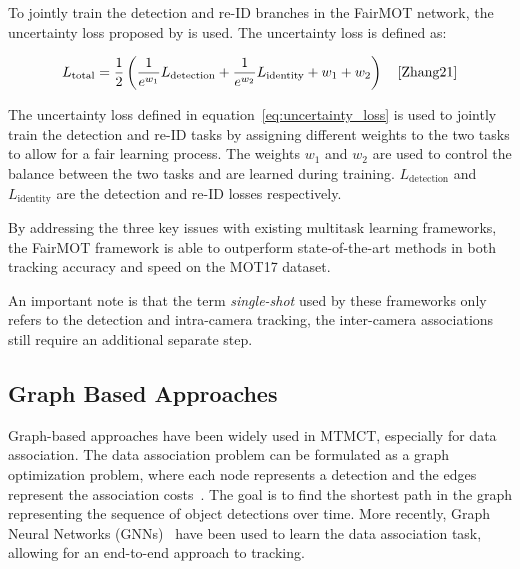 To jointly train the detection and re-ID branches in the FairMOT network, the uncertainty loss proposed by \textcite{Cipolla18} is used. The uncertainty loss is defined as:

\begin{equation}
    \label{eq:uncertainty_loss}
    L_{\text{total}}=\frac{1}{2}\left(\frac{1}{e^{w_1}} L_{\text{detection}}+\frac{1}{e^{w_2}} L_{\text{identity}}+w_1+w_2\right)
    \quad\text{\cite[Eq.~5]{Zhang21}}
\end{equation}

The uncertainty loss defined in equation~\ref{eq:uncertainty_loss} is used to jointly train the detection and re-ID tasks by assigning different weights to the two tasks to allow for a fair learning process. The weights \(w_1\) and \(w_2\) are used to control the balance between the two tasks and are learned during training. \(L_{\text{detection}}\) and \(L_{\text{identity}}\) are the detection and re-ID losses respectively.

By addressing the three key issues with existing multitask learning frameworks, the FairMOT framework is able to outperform state-of-the-art methods in both tracking accuracy and speed on the MOT17 dataset.

An important note is that the term \textit{single-shot} used by these frameworks only refers to the detection and intra-camera tracking, the inter-camera associations still require an additional separate step.

\subsection{Graph Based Approaches}\label{subsec:graph_based_approaches}
Graph-based approaches have been widely used in MTMCT, especially for data association. The data association problem can be formulated as a graph optimization problem, where each node represents a detection and the edges represent the association costs~\cite{Zhang08}. The goal is to find the shortest path in the graph representing the sequence of object detections over time. More recently, Graph Neural Networks (GNNs)~\cite{Scarselli09} have been used to learn the data association task, allowing for an end-to-end approach to tracking.

